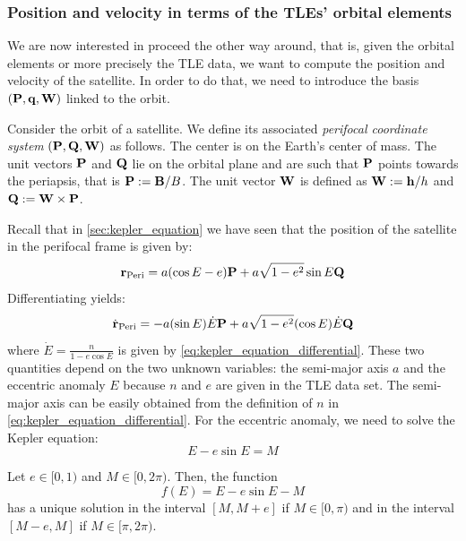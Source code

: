 \documentclass[../main.tex]{subfiles}
\begin{document}
\subsubsection{Position and velocity in terms of the TLEs' orbital elements}
We are now interested in proceed the other way around, that is, given the orbital elements or more precisely the TLE data, we want to compute the position and velocity of the satellite. In order to do that, we need to introduce the basis $(\boldsymbol{\mathrm{P}}, \boldsymbol{\mathrm{q}}, \boldsymbol{\mathrm{W}})$ linked to the orbit.
\begin{definition}\label{def:perifocal_coordinate_system}
  Consider the orbit of a satellite. We define its associated \emph{perifocal coordinate system} $(\boldsymbol{\mathrm{P}}, \boldsymbol{\mathrm{Q}}, \boldsymbol{\mathrm{W}})$ as follows. The center is on the Earth's center of mass. The unit vectors $\boldsymbol{\mathrm{P}}$ and $\boldsymbol{\mathrm{Q}}$ lie on the orbital plane and are such that $\boldsymbol{\mathrm{P}}$ points towards the periapsis, that is $\boldsymbol{\mathrm{P}}:=\boldsymbol{\mathrm{B}}/B$. The unit vector $\boldsymbol{\mathrm{W}}$ is defined as $\boldsymbol{\mathrm{W}}:=\boldsymbol{\mathrm{h}}/h$ and $\boldsymbol{\mathrm{Q}}:=\boldsymbol{\mathrm{W}}\times\boldsymbol{\mathrm{P}}$.
\end{definition}
Recall that in \cref{sec:kepler_equation} we have seen that the position of the satellite in the perifocal frame is given by:
\begin{equation}
  \boldsymbol{\mathrm{r}}_\mathrm{Peri} = a(\cos E-e)\boldsymbol{\mathrm{P}} + a\sqrt{1-e^2}\sin E\boldsymbol{\mathrm{Q}}
\end{equation}
Differentiating yields:
\begin{equation}
  \dot{\boldsymbol{\mathrm{r}}}_\mathrm{Peri} = - a (\sin E)\dot{E}\boldsymbol{\mathrm{P}}+a\sqrt{1-e^2}(\cos E)\dot{E}\boldsymbol{\mathrm{Q}}
\end{equation}
where $\dot{E}=\frac{n}{1-e\cos E}$ is given by \cref{eq:kepler_equation_differential}. These two quantities depend on the two unknown variables: the semi-major axis $a$ and the eccentric anomaly $E$ because $n$ and $e$ are given in the TLE data set. The semi-major axis can be easily obtained from the definition of $n$ in \cref{eq:kepler_equation_differential}. For the eccentric anomaly, we need to solve the Kepler equation:
\begin{equation}
  E-e\sin E = M
\end{equation}
\begin{lemma}
  Let $e\in[0,1)$ and $M\in[0,2\pi)$. Then, the function
  \begin{equation}
    f(E) = E-e\sin E - M
  \end{equation}
  has a unique solution in the interval $[M, M+e]$ if $M\in[0,\pi)$ and in the interval $[M-e, M]$ if $M\in[\pi,2\pi)$.
\end{lemma}
\end{document}
